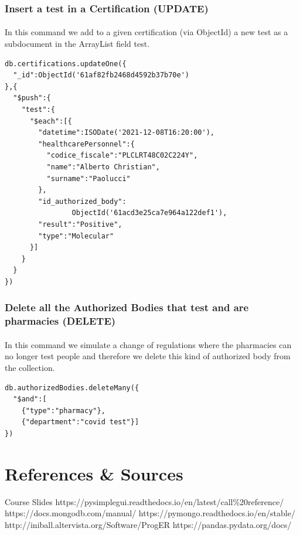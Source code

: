 \documentclass[a4paper,12pt]{article}
\begin{document}
\subsubsection{Insert a test in a Certification (UPDATE) }
\paragraph{} In this command we add to a given certification (via ObjectId) a new test as a subdocument in the ArrayList field test.
\begin{tcolorbox}[colback=orange!5!white,colframe=orange!75!black,title=COMMAND]
\begin{verbatim}
db.certifications.updateOne({
  "_id":ObjectId('61af82fb2468d4592b37b70e')
},{
  "$push":{
    "test":{
      "$each":[{
        "datetime":ISODate('2021-12-08T16:20:00'),
        "healthcarePersonnel":{
          "codice_fiscale":"PLCLRT48C02C224Y",
          "name":"Alberto Christian",
          "surname":"Paolucci"
        },
        "id_authorized_body":
                ObjectId('61acd3e25ca7e964a122def1'),
        "result":"Positive",
        "type":"Molecular"
      }]
    }
  }
})
\end{verbatim}
\end{tcolorbox}


\subsubsection{Delete all the Authorized Bodies that test and are pharmacies (DELETE)}
\paragraph{} In this command we simulate a change of regulations where the pharmacies can no longer test people and therefore we delete this kind of authorized body from the collection.
\begin{tcolorbox}[colback=orange!5!white,colframe=orange!75!black,title=COMMAND]
\begin{verbatim}
db.authorizedBodies.deleteMany({
  "$and":[
    {"type":"pharmacy"},
    {"department":"covid test"}]
})

\end{verbatim}
\end{tcolorbox}
\clearpage
\section{References \& Sources}
  \begin{thebibliography}{9}
    \bibitem{} Course Slides
    \bibitem{} https://pysimplegui.readthedocs.io/en/latest/call\%20reference/
    \bibitem{} https://docs.mongodb.com/manual/
    \bibitem{} https://pymongo.readthedocs.io/en/stable/
    \bibitem{} http://iniball.altervista.org/Software/ProgER
    \bibitem{} https://pandas.pydata.org/docs/
  \end{thebibliography}
\end{document}

